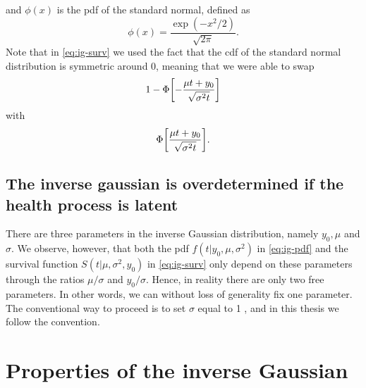 and $\phi(x)$ is the pdf of the standard normal, defined as
\begin{equation}
    \phi(x)=\frac{\exp\left(-x^2/2\right)}{\sqrt{2\pi}}.
\end{equation}
Note that in \eqref{eq:ig-surv} we used the fact that the cdf of the standard normal distribution is symmetric around 0,
meaning that we were able to swap
\begin{equation*}
    1-\Phi\sqb*{-\frac{\mu t+y_0}{\sqrt{\sigma^2t}}}
\end{equation*}
with
\begin{equation*}
    \Phi\sqb*{\frac{\mu t+y_0}{\sqrt{\sigma^2t}}}.
\end{equation*}

\subsection{The inverse gaussian is overdetermined if the health process is latent}
There are three parameters in the inverse Gaussian distribution, namely $y_0, \mu$ and $\sigma$.
We observe, however, that both the pdf $f(t|y_0,\mu,\sigma^2)$ in \eqref{eq:ig-pdf} and the survival function $S(t|\mu,\sigma^2,y_0)$ in \eqref{eq:ig-surv} only depend on these parameters through the ratios $\mu/\sigma$ and $y_0/\sigma$.
Hence, in reality there are only two free parameters.
In other words, we can without loss of generality fix one parameter.
The conventional way to proceed is to set $\sigma$ equal to 1 \citep{leewhitmore2006}, and in this thesis we follow the convention.

\section{Properties of the inverse Gaussian}

